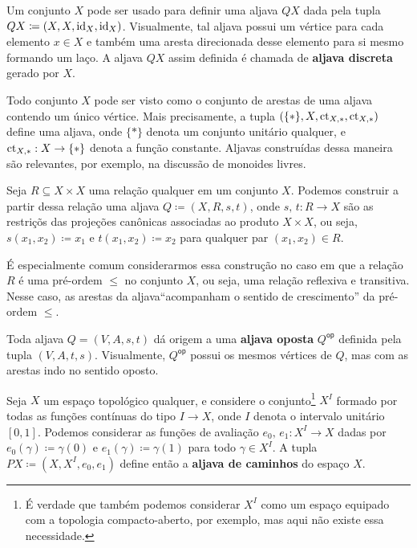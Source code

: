 \begin{exem}\label{exem:aljava_discreta}
    Um conjunto $X$ pode ser usado para definir uma aljava $QX$ dada pela tupla $QX \coloneqq (X,X,\mathrm{id}_X,\mathrm{id}_X)$.
    Visualmente, tal aljava possui um vértice para cada elemento $x \in X$ e também uma aresta direcionada desse elemento para si mesmo formando um laço.
    A aljava $QX$ assim definida é chamada de \textbf{aljava discreta} gerado por $X$.
\end{exem}

\begin{exem}\label{exem:aljava_sobre_ponto}
    Todo conjunto $X$ pode ser visto como o conjunto de arestas de uma aljava contendo um único vértice.
    Mais precisamente, a tupla $(\{*\},X,\mathrm{ct}_{X,*},\mathrm{ct}_{X,*})$ define uma aljava, onde $\{*\}$ denota um conjunto unitário qualquer, e $\mathrm{ct}_{X,*}: X \to \{*\}$ denota a função constante.
    Aljavas construídas dessa maneira são relevantes, por exemplo, na discussão de monoides livres.
\end{exem}

\begin{exem}\label{exem:aljava_via_relacao}
    Seja $R \subseteq X \times X$ uma relação qualquer em um conjunto $X$.
    Podemos construir a partir dessa relação uma aljava $Q \coloneqq (X,R,s,t)$, onde $s,\,t: R \to X$ são as restriçõs das projeções canônicas associadas ao produto $X \times X$, ou seja, $s(x_1,x_2) \coloneqq x_1$ e $t(x_1,x_2) \coloneqq x_2$ para qualquer par $(x_1,x_2) \in R$.
    
    É especialmente comum considerarmos essa construção no caso em que a relação $R$ é uma pré-ordem $\leq$ no conjunto $X$, ou seja, uma relação reflexiva e transitiva.
    Nesse caso, as arestas da aljava``acompanham o sentido de crescimento'' da pré-ordem $\leq$.
\end{exem}

\begin{exem}\label{exem:aljava_oposta}
    Toda aljava $Q=(V,A,s,t)$ dá origem a uma \textbf{aljava oposta} $Q^{\mathsf{op}}$ definida pela tupla $(V,A,t,s)$.
    Visualmente, $Q^{\mathsf{op}}$ possui os mesmos vértices de $Q$, mas com as arestas indo no sentido oposto.
\end{exem}

\begin{exem}\label{exem:aljava_via_espaco}
    Seja $X$ um espaço topológico qualquer, e considere o conjunto\footnote{É verdade que também podemos considerar $X^I$ como um espaço equipado com a topologia compacto-aberto, por exemplo, mas aqui não existe essa necessidade.} $X^I$ formado por todas as funções contínuas do tipo $I \to X$, onde $I$ denota o intervalo unitário $[0,1]$.
    Podemos considerar as funções de avaliação $e_0,\, e_1: X^I \to X$ dadas por $e_0(\gamma) \coloneqq \gamma(0)$ e $e_1(\gamma) \coloneqq \gamma(1)$ para todo $\gamma \in X^{I}$.
    A tupla $PX \coloneqq (X,X^I,e_0,e_1)$ define então a \textbf{aljava de caminhos} do espaço $X$.
\end{exem}

